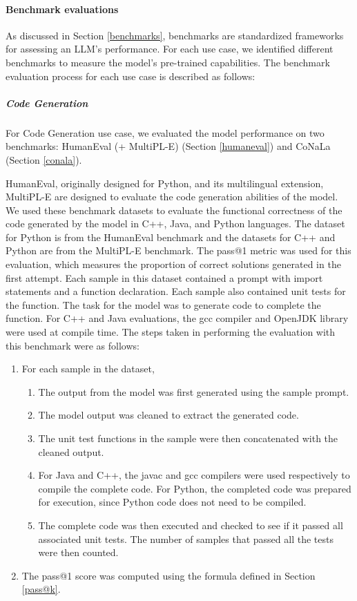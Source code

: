 \paragraph{Benchmark evaluations}
As discussed in Section \ref{benchmarks}, benchmarks are standardized frameworks for assessing an LLM’s performance. For each use case, we identified different benchmarks to measure the model’s pre-trained capabilities. The benchmark evaluation process for each use case is described as follows:
\subparagraph{Code Generation}
For Code Generation use case, we evaluated the model performance on two benchmarks: HumanEval (+ MultiPL-E) (Section \ref{humaneval}) and CoNaLa (Section \ref{conala}). 

HumanEval, originally designed for Python, and its multilingual extension, MultiPL-E are designed to evaluate the code generation abilities of the model. We used these benchmark datasets to evaluate the functional correctness of the code generated by the model in C++, Java, and Python languages. The dataset for Python is from the HumanEval benchmark and the datasets for C++ and Python are from the MultiPL-E benchmark. The pass@1 metric %
was used for this evaluation, which measures the proportion of correct solutions generated in the first attempt. Each sample in this dataset contained a prompt with import statements and a function declaration. Each sample also contained unit tests for the function. The task for the model was to generate code to complete the function. For C++ and Java evaluations, the gcc compiler and OpenJDK library were used at compile time. The steps taken in performing the evaluation with this benchmark were as follows:
\begin{enumerate}
\item For each sample in the dataset,
\begin{enumerate} [label*=\arabic*.]
\item The output from the model was first generated using the sample prompt.
\item The model output was cleaned to extract the generated code.
\item The unit test functions in the sample were then concatenated with the cleaned output.
\item For Java and C++, the javac and gcc compilers were used respectively to compile the complete code. For Python, the completed code was prepared for execution, since Python code does not need to be compiled.
\item The complete code was then executed and checked to see if it passed all associated unit tests. The number of samples that passed all the tests were then counted. 
\end{enumerate}
\item The pass@1 score was computed using the formula defined in Section \ref{pass@k}.
\end{enumerate}


